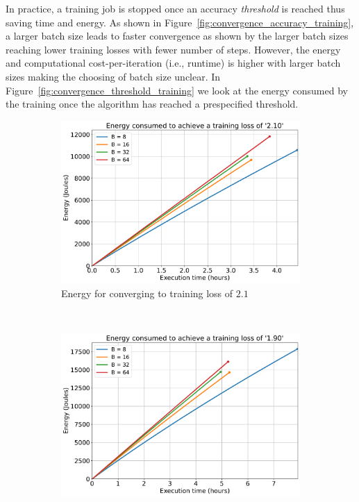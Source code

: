 \documentclass{article}
\begin{document}
{        In practice, a training job is stopped once an accuracy \textit{threshold} is reached thus saving time and energy. As shown in Figure~\ref{fig:convergence_accuracy_training}, a larger batch size leads to faster convergence as shown by the larger batch sizes reaching lower training losses with fewer number of steps. However, the energy and computational cost-per-iteration (i.e., runtime) is higher with larger batch sizes making the choosing of batch size unclear. In Figure~\ref{fig:convergence_threshold_training} we look at the energy consumed by the training once the algorithm has reached a prespecified threshold.

        \begin{figure}[!t]
            \centering
            \begin{subfigure}[b]{0.47 \textwidth}
                \includegraphics[trim = {0.0in 0.0in 0.0in 0.0in}, clip, width = 1.0 \textwidth]{../Figures/time_vs_energy_converged_training_210.pdf}
                \caption{Energy for converging to training loss of $2.1$}
                \label{fig:convergence_energy_training_210}
            \end{subfigure}
            ~
            \begin{subfigure}[b]{0.47 \textwidth}
                \includegraphics[trim = {0.0in 0.0in 0.0in 0.0in}, clip, width = 1.0 \textwidth]{../Figures/time_vs_energy_converged_training_190.pdf}

\end{subfigure}
\end{figure}}
\end{document}
